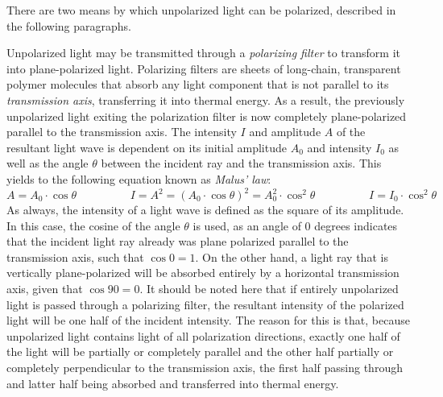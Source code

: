 There are two means by which unpolarized light can be polarized, described in the following paragraphs.


Unpolarized light may be transmitted through a \emph{polarizing filter} to transform it into plane-polarized light. Polarizing filters are sheets of long-chain, transparent polymer molecules that absorb any light component that is not parallel to its \emph{transmission axis}, transferring it into thermal energy. As a result, the previously unpolarized light exiting the polarization filter is now completely plane-polarized parallel to the transmission axis. The intensity $I$ and amplitude $A$ of the resultant light wave is dependent on its initial amplitude $A_0$ and intensity $I_0$ as well as the angle $\theta$ between the incident ray and the transmission axis. This yields to the following equation known as \emph{Malus' law}: $$A = A_0 \cdot \cos \theta \hspace{2cm} I = A^2 = (A_0 \cdot \cos \theta)^2 = A_0^2 \cdot \cos^2 \theta \hspace{2cm} I = I_0 \cdot \cos^2 \theta$$ As always, the intensity of a light wave is defined as the square of its amplitude. In this case, the cosine of the angle $\theta$ is used, as an angle of 0 degrees indicates that the incident light ray already was plane polarized parallel to the transmission axis, such that $\cos 0 = 1$. On the other hand, a light ray that is vertically plane-polarized will be absorbed entirely by a horizontal transmission axis, given that $\cos 90 = 0$. It should be noted here that if entirely unpolarized light is passed through a polarizing filter, the resultant intensity of the polarized light will be one half of the incident intensity. The reason for this is that, because unpolarized light contains light of all polarization directions, exactly one half of the light will be partially or completely parallel and the other half partially or completely perpendicular to the transmission axis, the first half passing through and latter half being absorbed and transferred into thermal energy.

